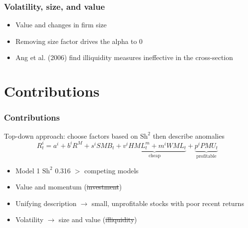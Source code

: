 \documentclass[notes]{beamer}  %
\begin{document}
\begin{frame} \frametitle{Volatility, size, and value}
  \begin{itemize}
    \item Value and changes in firm size \parencite{gerakos2017decomposing}
    \item Removing size factor drives the alpha to 0
    \item Ang et al. (2006) find illiquidity measures ineffective in the cross-section
  \end{itemize}
\end{frame}


\section{Contributions}

\begin{frame} \frametitle{Contributions}
  Top-down approach: choose factors based on $\text{Sh}^2$ then describe anomalies
  \[R_t^i = a^i+b^iR^M+s^iSMB_t+\underbrace{v^iHML_t^m+m^iWML_t}_\text{cheap}+\underbrace{p^iPMU_t}_\text{profitable}\]
  \begin{itemize}
    \item Model 1 $\text{Sh}^2$ 0.316 $>$ competing models
    \item Value and momentum (\sout{investment})
    \item Unifying description $\rightarrow$ small, unprofitable stocks with poor recent returns
    \item Volatility $\rightarrow$ size and value (\sout{illiquidity})
  \end{itemize}
\end{frame}
\end{document}

